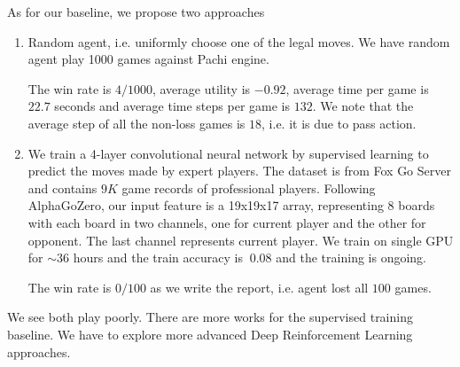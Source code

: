 \documentclass{article}
\begin{document}
As for our baseline, we propose two approaches
\begin{enumerate}
  \item
    Random agent, i.e. uniformly choose one of the legal moves. We have random agent play 1000 games against Pachi engine. 

    The win rate is $4/1000$, average utility is $-0.92$, average time per game is $22.7$ seconds and average time steps per game is $132$. We note that the average step of all the non-loss games is $18$, i.e. it is due to pass action.
  \item
    We train a 4-layer convolutional neural network by supervised learning to predict the moves made by expert players. The dataset is from Fox Go Server \cite{FoxGoServer} and contains $9K$ game records of professional players. Following AlphaGoZero, our input feature is a 19x19x17 array, representing 8 boards with each board in two channels, one for current player and the other for opponent. The last channel represents current player. We train on single GPU for $\sim 36$ hours and the train accuracy is $~0.08$ and the training is ongoing.

    The win rate is $0/100$ as we write the report, i.e. agent lost all $100$ games.
\end{enumerate}

We see both play poorly. There are more works for the supervised training baseline. We have to explore more advanced Deep Reinforcement Learning approaches.



 

\end{document}
